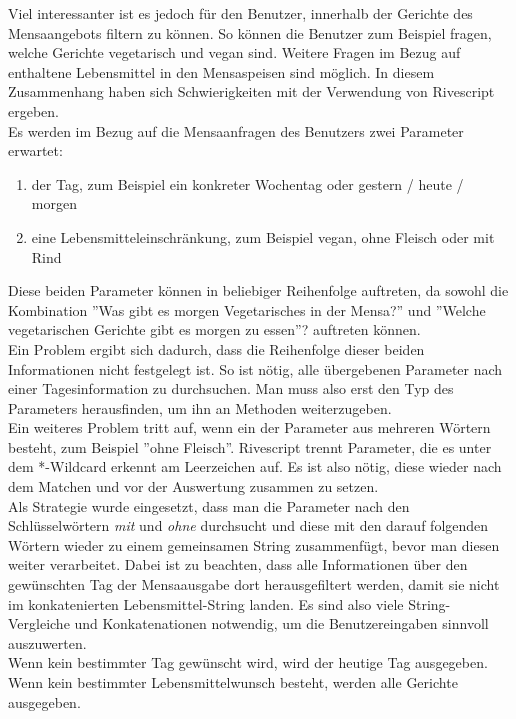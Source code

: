 Viel interessanter ist es jedoch für den Benutzer, innerhalb der Gerichte des Mensaangebots filtern zu können. So können die Benutzer zum Beispiel fragen, welche Gerichte vegetarisch und vegan sind. Weitere Fragen im Bezug auf enthaltene Lebensmittel in den Mensaspeisen sind möglich.
In diesem Zusammenhang haben sich Schwierigkeiten mit der Verwendung von Rivescript ergeben. \\
Es werden im Bezug auf die Mensaanfragen des Benutzers zwei Parameter erwartet:
\begin{enumerate}[noitemsep]
    \item der Tag, zum Beispiel ein konkreter Wochentag oder gestern / heute / morgen
    \item eine Lebensmitteleinschränkung, zum Beispiel vegan, ohne Fleisch oder mit Rind 
\end{enumerate}
Diese beiden Parameter können in beliebiger Reihenfolge auftreten, da sowohl die Kombination 
''Was gibt es morgen Vegetarisches in der Mensa?'' und
''Welche vegetarischen Gerichte gibt es morgen zu essen''?
auftreten können. \\
Ein Problem ergibt sich dadurch, dass die Reihenfolge dieser beiden Informationen nicht festgelegt ist. So ist nötig, alle übergebenen Parameter nach einer Tagesinformation zu durchsuchen. Man muss also erst den Typ des Parameters herausfinden, um ihn an Methoden weiterzugeben. \\
Ein weiteres Problem tritt auf, wenn ein der Parameter aus mehreren Wörtern besteht, zum Beispiel ''ohne Fleisch''. Rivescript trennt Parameter, die es unter dem *-Wildcard erkennt am Leerzeichen auf. Es ist also nötig, diese wieder nach dem Matchen und vor der Auswertung zusammen zu setzen. \\
Als Strategie wurde eingesetzt, dass man die Parameter nach den Schlüsselwörtern \emph{mit} und \emph{ohne} durchsucht und diese mit den darauf folgenden Wörtern wieder zu einem gemeinsamen String zusammenfügt, bevor man diesen weiter verarbeitet. Dabei ist zu beachten, dass alle Informationen über den gewünschten Tag der Mensaausgabe dort herausgefiltert werden, damit sie nicht im konkatenierten Lebensmittel-String landen. Es sind also viele String-Vergleiche und Konkatenationen notwendig, um die Benutzereingaben sinnvoll auszuwerten. \\
Wenn kein bestimmter Tag gewünscht wird, wird der heutige Tag ausgegeben. Wenn kein bestimmter Lebensmittelwunsch besteht, werden alle Gerichte ausgegeben.

